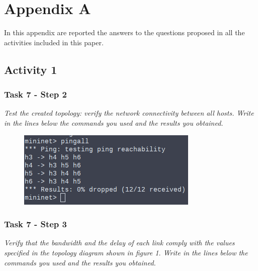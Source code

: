 \section*{Appendix A}

In this appendix are reported the answers to the questions proposed in all the
activities included in this paper.


\subsection*{Activity 1}

\subsubsection*{Task 7 - Step 2}
\textit{Test the created topology: verify the network connectivity between all hosts.
Write in the lines below the commands you used and the results you obtained.}
\begin{figure}[htb]
	\centering
	\includegraphics[width=0.5\linewidth]{img/task-7-step-2.png}
\end{figure}



\subsubsection*{Task 7 - Step 3}
\textit{Verify that the bandwidth and the delay of each link comply with the values
specified in the topology diagram shown in figure 1. Write in the lines below
the commands you used and the results you obtained.}

